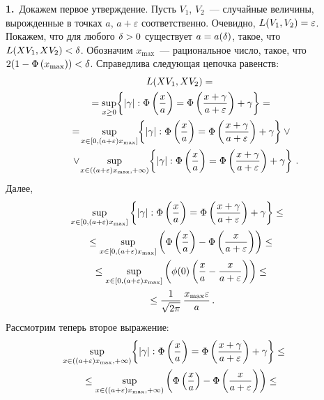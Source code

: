 \begin{multicols}{2}
\noindent
\textbf{1.}\ Докажем первое утверждение.
Пусть  $V_1$, $V_2$~--- случайные величины, вы\-рож\-ден\-ные в точках $a$, $a+\varepsilon$ соответственно.
      Очевидно, $L(V_1, V_2) \hm= \varepsilon$. Покажем, что для любого
       $\delta\hm>0$ существует $a \hm= a(\delta)$, такое, что
      $L(X V_1, X V_2)\hm < \delta$. Обозначим $x_{\max}$~--- рациональное число, такое, что
      $2( 1 \hm- \Phi\left(  x_{\max} \right) )\hm<\delta$. Справедлива следующая  цепочка равенств:
      \begin{multline*}
      L(X V_1, X V_2)= {}\\
      {}=\sup\limits_{x \ge 0}\!
      \left\{|\gamma| : \Phi\left(\fr{x}{a}\right) =
      \Phi\left(\fr{x+\gamma}{a+\varepsilon}\right)+\gamma
      \right\}={}
\\{}
      =\!\sup\limits_{x \in [0,(a+\varepsilon)x_{\max}]}\!
      \left\{|\gamma| : \Phi\left(\fr{x}{a}\right) =
      \Phi\left(\fr{x+\gamma}{a+\varepsilon}\right)+\gamma
      \right\}\vee{}\\
{}
      \vee\!\sup\limits_{x \in \left((a+\varepsilon)x_{\max},+\infty\right)}
      \!\left\{|\gamma| : \Phi\left(\fr{x}{a}\right) =
      \Phi\left(\fr{x+\gamma}{a+\varepsilon}\right)+\gamma
      \right\}\,.\hspace*{-7.91489pt}
      \end{multline*}
      Далее,
      \begin{multline*}
      \!\!\!\sup\limits_{x \in [0,(a+\varepsilon)x_{\max}]}
      \left\{|\gamma| : \Phi\left(\displaystyle\frac{\displaystyle x\mathstrut}{\displaystyle a\mathstrut}\right) =
      \Phi\left(\displaystyle\frac{\displaystyle x+\gamma\mathstrut}{\displaystyle a+\varepsilon\mathstrut}\right)+\gamma
      \right\}\le{}\\
      {}\le
      \sup\limits_{x \in [0,(a+\varepsilon)x_{\max}]}
      \left(
      \Phi\left(\displaystyle\frac{\displaystyle x\mathstrut}{\displaystyle a\mathstrut}\right) -
      \Phi\left(\displaystyle\frac{\displaystyle x \mathstrut}{\displaystyle a+\varepsilon\mathstrut} \right)
      \right)\le{}
\\
  {}    \le
      \sup\limits_{x \in [0,(a+\varepsilon)x_{\max}]}
      \left(       \phi(0)       \left(       \displaystyle\frac{\displaystyle x\mathstrut}{\displaystyle a\mathstrut}  -
      \frac{x }{a+\varepsilon}       \right)
      \right)\le {}\\
      {}\le      \displaystyle\frac{\displaystyle  1\mathstrut}{\displaystyle \sqrt{2 \pi} \mathstrut}\,\displaystyle\frac{\displaystyle x_{\max}\varepsilon \mathstrut}{\displaystyle a\mathstrut}\,.
      \end{multline*}
      Рассмотрим теперь второе выражение:
      \begin{multline*}
      \hspace*{-3mm}\!\!\sup\limits_{x \in ((a+\varepsilon)x_{\max},+\infty)}\!
      \left\{|\gamma| : \Phi\left(\fr{x}{a}\right) =
      \Phi\left(\fr{x+\gamma}{a+\varepsilon}\right)+\gamma
      \right\} \le{}\\
  {}   \le \sup\limits_{x \in ((a+\varepsilon)x_{\max},+\infty)}
      \left( \Phi\left(\frac{x}{a}\right) -
      \Phi\left(\fr{x }{a+\varepsilon} \right)
      \right) \le {}
      \end{multline*}


\end{multicols}
